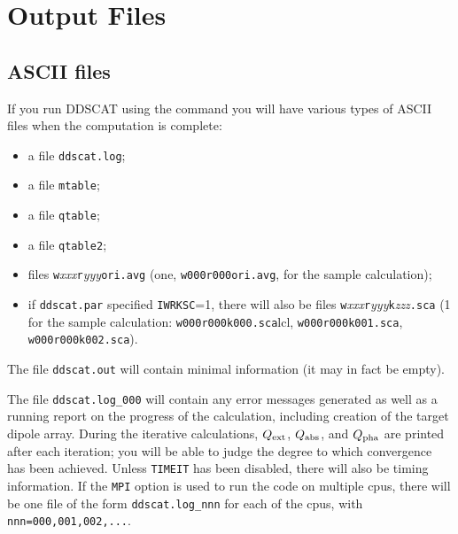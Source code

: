 \section{Output Files}

\subsection{ ASCII files\label{subsec:ascii}}

If you run DDSCAT using the command\hfill\break \indent{} \hfill\break you will have various types of
ASCII files when the computation is complete:
\begin{itemize}
\item a file {\tt ddscat.log};
\item a file {\tt mtable};
\item a file {\tt qtable};
\item a file {\tt qtable2};
\item files {\tt w}{\it xxx}{\tt r}{\it yyy}{\tt ori.avg} 
	(one, {\tt w000r000ori.avg}, for the sample calculation);
\item if {\tt ddscat.par} specified {\tt IWRKSC}=1, there will also be
	files {\tt w}{\it xxx}{\tt r}{\it yyy}{\tt k}{\it zzz}{\tt .sca} (1 for
	the sample calculation: {\tt w000r000k000.sca}lcl, {\tt w000r000k001.sca},
	{\tt w000r000k002.sca}).
\end{itemize}

The file {\tt ddscat.out} will contain minimal information (it may in fact
be empty).

The file {\tt ddscat.log\_000} will contain any error messages generated as
well as a running report on the progress of the calculation, including
creation of the target dipole array.  During the iterative
calculations, $Q_{\rm ext}$, $Q_{\rm abs}$, and $Q_{\rm pha}$ are printed after
each iteration; you will be able to judge the degree to which
convergence has been achieved.  Unless {\tt TIMEIT} has been disabled,
there will also be timing information.
If the {\tt MPI} option is used to run the code on multiple cpus, there
will be one file of the form {\tt ddscat.log\_nnn} for each of the
cpus, with {\tt nnn=000,001,002,...}.

